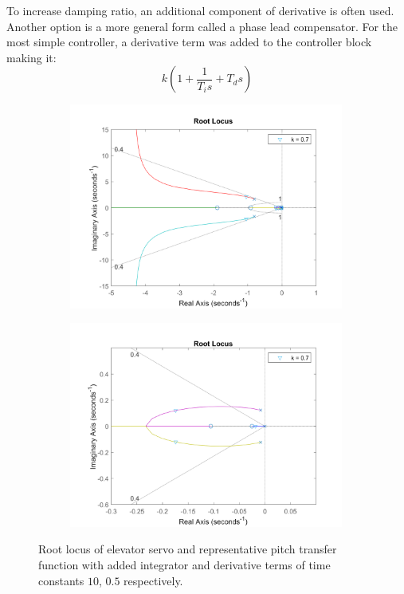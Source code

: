 \documentclass{article}
\begin{document}
To increase damping ratio, an additional component of derivative is often used.
Another option is a more general form called a phase lead compensator.
For the most simple controller, a derivative term was added to the controller block making it:
\begin{equation}
    k\left(1 + \frac{1}{T_i s} + T_d s\right)
\end{equation}

\begin{figure}[H]
    \centering
    \begin{subfigure}{0.45\textwidth}
        \centering
        \includegraphics[width=0.99\textwidth]{figures/pitch_autopilot_locus_TiTd.png}
    \end{subfigure}
    \begin{subfigure}{0.45\textwidth}
        \centering
        \includegraphics[width=0.99\textwidth]{figures/pitch_autopilot_locus_TiTd_zoomed.png}
    \end{subfigure}
    \caption{Root locus of elevator servo and representative pitch transfer function \cite{rep} with added integrator and derivative terms of time constants $10$, $0.5$ respectively.}
    \label{fig:pitch_autopilot_compensated_locus}
\end{figure}
\end{document}
